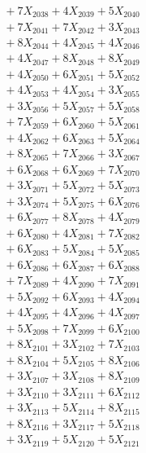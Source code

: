 \documentclass[a4paper,10pt]{article}
\begin{document}
{\begin{align}
&\;  + 7 X_{2038} + 4 X_{2039} + 5 X_{2040} \\[0.3ex]
&\;  + 7 X_{2041} + 7 X_{2042} + 3 X_{2043} \\[0.3ex]
&\;  + 8 X_{2044} + 4 X_{2045} + 4 X_{2046} \\[0.3ex]
&\;  + 4 X_{2047} + 8 X_{2048} + 8 X_{2049} \\[0.5ex]\allowbreak
&\;  + 4 X_{2050} + 6 X_{2051} + 5 X_{2052} \\[0.3ex]
&\;  + 4 X_{2053} + 4 X_{2054} + 3 X_{2055} \\[0.3ex]
&\;  + 3 X_{2056} + 5 X_{2057} + 5 X_{2058} \\[0.3ex]
&\;  + 7 X_{2059} + 6 X_{2060} + 5 X_{2061} \\[0.3ex]
&\;  + 4 X_{2062} + 6 X_{2063} + 5 X_{2064} \\[0.3ex]
&\;  + 8 X_{2065} + 7 X_{2066} + 3 X_{2067} \\[0.3ex]
&\;  + 6 X_{2068} + 6 X_{2069} + 7 X_{2070} \\[0.3ex]
&\;  + 3 X_{2071} + 5 X_{2072} + 5 X_{2073} \\[0.3ex]
&\;  + 3 X_{2074} + 5 X_{2075} + 6 X_{2076} \\[0.3ex]
&\;  + 6 X_{2077} + 8 X_{2078} + 4 X_{2079} \\[0.5ex]\allowbreak
&\;  + 6 X_{2080} + 4 X_{2081} + 7 X_{2082} \\[0.3ex]
&\;  + 6 X_{2083} + 5 X_{2084} + 5 X_{2085} \\[0.3ex]
&\;  + 6 X_{2086} + 6 X_{2087} + 6 X_{2088} \\[0.3ex]
&\;  + 7 X_{2089} + 4 X_{2090} + 7 X_{2091} \\[0.3ex]
&\;  + 5 X_{2092} + 6 X_{2093} + 4 X_{2094} \\[0.3ex]
&\;  + 4 X_{2095} + 4 X_{2096} + 4 X_{2097} \\[0.3ex]
&\;  + 5 X_{2098} + 7 X_{2099} + 6 X_{2100} \\[0.3ex]
&\;  + 8 X_{2101} + 3 X_{2102} + 7 X_{2103} \\[0.3ex]
&\;  + 8 X_{2104} + 5 X_{2105} + 8 X_{2106} \\[0.3ex]
&\;  + 3 X_{2107} + 3 X_{2108} + 8 X_{2109} \\[0.5ex]\allowbreak
&\;  + 3 X_{2110} + 3 X_{2111} + 6 X_{2112} \\[0.3ex]
&\;  + 3 X_{2113} + 5 X_{2114} + 8 X_{2115} \\[0.3ex]
&\;  + 8 X_{2116} + 3 X_{2117} + 5 X_{2118} \\[0.3ex]
&\;  + 3 X_{2119} + 5 X_{2120} + 5 X_{2121} \\[0.3ex]

\end{align}}
\end{document}

